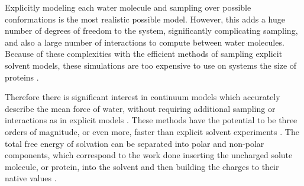 Explicitly modeling each water molecule and sampling over possible conformations is the most realistic possible model.
However, this adds a huge number of degrees of freedom to the system, significantly complicating sampling, and also a large number of interactions to compute between water molecules.
Because of these complexities with the efficient methods of sampling explicit solvent models, these simulations are too expensive to use on systems the size of proteins \cite{figueirido1997large,zhang2001solvent}.

Therefore there is significant interest in continuum models which accurately describe the mean force of water, without requiring additional sampling or interactions as in explicit models \cite{zhang2001solvent,still1990semianalytical,qiu1997gb}.
These methods have the potential to be three orders of magnitude, or even more, faster than explicit solvent experiments \cite{zhang2001solvent}.
The total free energy of solvation can be separated into polar and non-polar components, which correspond to the work done inserting the uncharged solute molecule, or protein, into the solvent and then building the charges to their native values \cite{roux1999implicit}.


\cite{roux1999implicit}
